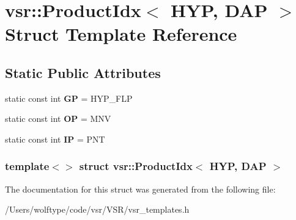\hypertarget{structvsr_1_1_product_idx_3_01_h_y_p_00_01_d_a_p_01_4}{\section{vsr\-:\-:Product\-Idx$<$ H\-Y\-P, D\-A\-P $>$ Struct Template Reference}
\label{structvsr_1_1_product_idx_3_01_h_y_p_00_01_d_a_p_01_4}
}
\subsection*{Static Public Attributes}
\begin{DoxyCompactItemize}
\item 
\hypertarget{structvsr_1_1_product_idx_3_01_h_y_p_00_01_d_a_p_01_4_ac081d2379ded876454d99d3a82e57687}{static const int {\bfseries G\-P} = H\-Y\-P\-\_\-\-F\-L\-P}\label{structvsr_1_1_product_idx_3_01_h_y_p_00_01_d_a_p_01_4_ac081d2379ded876454d99d3a82e57687}

\item 
\hypertarget{structvsr_1_1_product_idx_3_01_h_y_p_00_01_d_a_p_01_4_a3e52bf8b365a1d9ec97fccd6ce2bb601}{static const int {\bfseries O\-P} = M\-N\-V}\label{structvsr_1_1_product_idx_3_01_h_y_p_00_01_d_a_p_01_4_a3e52bf8b365a1d9ec97fccd6ce2bb601}

\item 
\hypertarget{structvsr_1_1_product_idx_3_01_h_y_p_00_01_d_a_p_01_4_ae3e4805aff61cde1bf9686756c25ed3e}{static const int {\bfseries I\-P} = P\-N\-T}\label{structvsr_1_1_product_idx_3_01_h_y_p_00_01_d_a_p_01_4_ae3e4805aff61cde1bf9686756c25ed3e}

\end{DoxyCompactItemize}
\subsubsection*{template$<$$>$ struct vsr\-::\-Product\-Idx$<$ H\-Y\-P, D\-A\-P $>$}



The documentation for this struct was generated from the following file\-:\begin{DoxyCompactItemize}
\item 
/\-Users/wolftype/code/vsr/\-V\-S\-R/vsr\-\_\-templates.\-h\end{DoxyCompactItemize}
